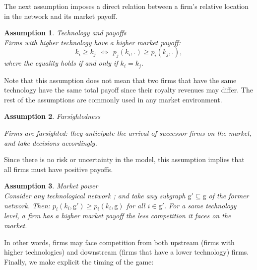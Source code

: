 \documentclass{article}
\newtheorem{assumption}{Assumption}
\begin{document}
\indent The next assumption imposes a direct relation between a firm's relative location in the network and its market payoff.\\  

\begin{assumption}{Technology and payoffs} \label{ass1}\\
Firms with higher technology have a higher market payoff:
\begin{equation*}
     k_i\geq k_j~~ \Leftrightarrow ~~ p_j(k_i,.)\geq  p_i(k_j,.),
\end{equation*}
where the equality holds if and only if $k_i=k_j$.
\end{assumption}

Note that this assumption does not mean that two firms that have the same technology have the same total payoff since their royalty revenues may differ. The rest of the assumptions are commonly used in any market environment. \\

\begin{assumption}{Farsightedness} \label{ass2}

Firms are farsighted: they anticipate the arrival of successor firms on the market, and take decisions accordingly. 
\end{assumption}

Since there is no risk or uncertainty in the model, this assumption implies that all firms must have positive payoffs. 

\begin{assumption}{Market power}\label{ass3}\\
Consider any technological network ; and take any subgraph $\text{g}'\subseteq \text{g}$ of the former network. Then: $p_i(k_i,\text{g}')\geq p_i(k_i,\text{g})$ for all $i\in \text{g}'$. For a same technology level, a firm has a higher market payoff the less competition it faces on the market. 
\end{assumption}

In other words, firms may face competition from both upstream (firms with higher technologies) and downstream (firms that have a lower technology) firms. \\

\indent Finally, we make explicit the timing of the game:       
\end{document}
